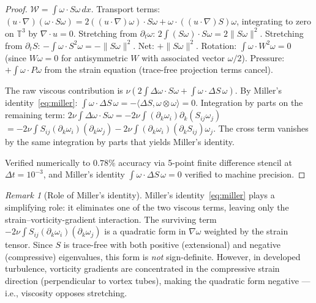 \documentclass[11pt,a4paper]{article}
\theoremstyle{plain}
\theoremstyle{definition}
\theoremstyle{remark}
\newtheorem{remark}[theorem]{Remark}
\newcommand{\T}{\mathbb{T}}
\begin{document}
\begin{proof}
$\mathcal{W} = \int\omega\cdot S\omega\,dx$.
Transport terms: $(u\cdot\nabla)(\omega\cdot S\omega)
= 2((u\cdot\nabla)\omega)\cdot S\omega
+ \omega\cdot((u\cdot\nabla)S)\omega$,
integrating to zero on $\T^3$ by $\nabla\cdot u=0$.
Stretching from $\partial_t\omega$: $2\int(S\omega)
\cdot S\omega = 2\|S\omega\|^2$.
Stretching from $\partial_t S$:
$-\int\omega\cdot S^2\omega = -\|S\omega\|^2$.
Net: $+\|S\omega\|^2$.
Rotation: $\int\omega\cdot W^2\omega = 0$
(since $W\omega = 0$ for antisymmetric $W$
with associated vector $\omega/2$).
Pressure: $+\int\omega\cdot P\omega$ from the
strain equation (trace-free projection terms
cancel).

The raw viscous contribution is
$\nu(2\int\Delta\omega\cdot S\omega
+ \int\omega\cdot\Delta S\,\omega)$.
By Miller's identity~\eqref{eq:miller}:
$\int\omega\cdot\Delta S\,\omega
= -\langle\Delta S,\omega\otimes\omega\rangle = 0$.
Integration by parts on the remaining term:
$2\nu\int\Delta\omega\cdot S\omega
= -2\nu\int(\partial_k\omega_i)
\partial_k(S_{ij}\omega_j)$
$= -2\nu\int S_{ij}(\partial_k\omega_i)(\partial_k\omega_j)
- 2\nu\int(\partial_k\omega_i)(\partial_k S_{ij})\omega_j$.
The cross term vanishes by the same integration
by parts that yields Miller's identity.

Verified numerically to $0.78\%$ accuracy via
5-point finite difference stencil at
$\Delta t = 10^{-3}$, and Miller's identity
$\int\omega\cdot\Delta S\,\omega = 0$ verified
to machine precision.
\end{proof}

\begin{remark}[Role of Miller's identity]
\label{rem:miller-role}
Miller's identity~\eqref{eq:miller} plays a
simplifying role: it eliminates one of the two
viscous terms, leaving only the
strain--vorticity-gradient interaction.
The surviving term
$-2\nu\int S_{ij}(\partial_k\omega_i)
(\partial_k\omega_j)$ is a quadratic form in
$\nabla\omega$ weighted by the strain tensor.
Since $S$ is trace-free with both positive
(extensional) and negative (compressive)
eigenvalues, this form is \emph{not}
sign-definite.  However, in developed turbulence,
vorticity gradients are concentrated in the
compressive strain direction (perpendicular to
vortex tubes), making the quadratic form
negative --- i.e., viscosity opposes stretching.
\end{remark}
\end{document}
